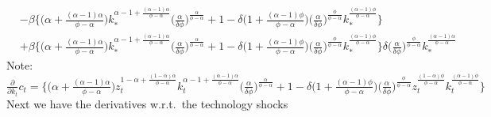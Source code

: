 \documentclass[a4paper]{article}
\theoremstyle{definition}
\begin{document}
\begin{align*}
												&- \beta \Big\{ \Big( {\alpha+\frac{(\alpha-1)\alpha}{\phi-\alpha}} \Big)  k_{*}^{\alpha-1+\frac{(\alpha-1)\alpha}{\phi-\alpha}} \Big( \frac{\alpha}{\delta\phi} \Big)^{\frac{\alpha}{\phi-\alpha}} + 1 - \delta \Big( {1+\frac{(\alpha-1)\phi}{\phi-\alpha}} \Big) \Big( \frac{\alpha}{\delta\phi} \Big)^{\frac{\phi}{\phi-\alpha}} k_{*}^{\frac{(\alpha-1)\phi}{\phi-\alpha}} \Big\} \\
												&+ \beta \Big\{ \Big( {\alpha+\frac{(\alpha-1)\alpha}{\phi-\alpha}} \Big) k_{*}^{\alpha-1+\frac{(\alpha-1)\alpha}{\phi-\alpha}} \Big( \frac{\alpha}{\delta\phi} \Big)^{\frac{\alpha}{\phi-\alpha}} + 1 - \delta \Big( {1+\frac{(\alpha-1)\phi}{\phi-\alpha}} \Big) \Big( \frac{\alpha}{\delta\phi} \Big)^{\frac{\phi}{\phi-\alpha}}k_{*}^{\frac{(\alpha-1)\phi}{\phi-\alpha}} \Big\} \delta \Big( \frac{\alpha}{\delta\phi} \Big)^{\frac{\phi}{\phi-\alpha}}k_{*}^{\frac{(\alpha-1)\alpha}{\phi-\alpha}}											
	\end{align*}	
Note: $\frac{\partial}{\partial k_t}c_t = \Big\{ \Big( {\alpha+\frac{(\alpha-1)\alpha}{\phi-\alpha}} \Big) z_{t}^{1-\alpha+\frac{(1-\alpha)\alpha}{\phi-\alpha}} k_{t}^{\alpha-1+\frac{(\alpha-1)\alpha}{\phi-\alpha}} \Big( \frac{\alpha}{\delta\phi} \Big)^{\frac{\alpha}{\phi-\alpha}} + 1 - \delta \Big( {1+\frac{(\alpha-1)\phi}{\phi-\alpha}} \Big) \Big( \frac{\alpha}{\delta\phi} \Big)^{\frac{\phi}{\phi-\alpha}}z_{t}^{\frac{(1-\alpha)\phi}{\phi-\alpha}}k_{t}^{\frac{(\alpha-1)\phi}{\phi-\alpha}} \Big\}$
Next we have the derivatives w.r.t.\ the technology shocks
\end{document}
